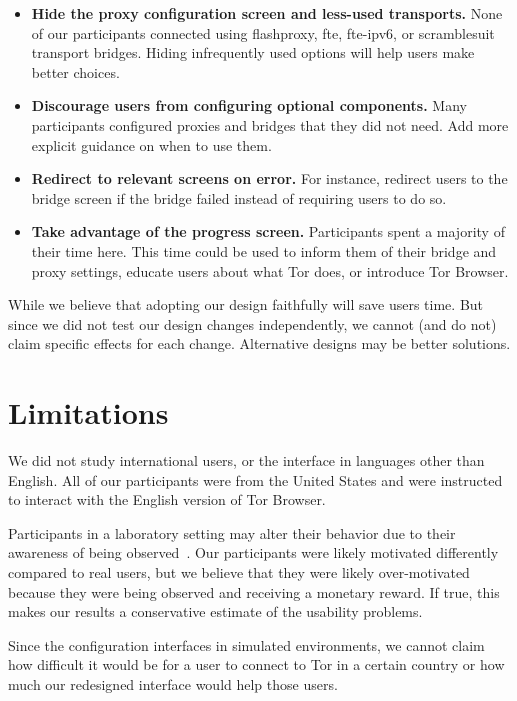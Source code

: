 \documentclass[USenglish,oneside,twocolumn]{article}
\begin{document}
\begin{itemize}
\item {\bfseries Hide the proxy configuration screen and less-used transports.} None of our participants connected using flashproxy, fte, fte-ipv6, or scramblesuit transport bridges. Hiding infrequently used options will help users make better choices.
\item {\bfseries Discourage users from configuring optional components.} Many participants configured proxies and bridges that they did not need. Add more explicit guidance on when to use them.
\item {\bfseries Redirect to relevant screens on error.} For instance, redirect users to the bridge screen if the bridge failed instead of requiring users to do so.
\item {\bfseries Take advantage of the progress screen.} Participants spent a majority of their time here. This time could be used to inform them of their bridge and proxy settings, educate users about what Tor does, or introduce Tor Browser.
\end{itemize}

While we believe that adopting our design faithfully will save users time. But since we did not test our design changes independently, we cannot (and do not) claim specific effects for each change. Alternative designs may be better solutions. 

\section{Limitations}
\label{sec:limitations}
We did not study international users, or the interface in languages other than English. All of our participants were from the United States and were instructed to interact with the English version of Tor Browser.

Participants in a laboratory setting may alter their behavior due to their awareness of being observed~\cite{mccarney2007hawthorne}. Our participants were likely motivated differently compared to real users, but we believe that they were likely over-motivated because they were being observed and receiving a monetary reward. If true, this makes our results a conservative estimate of the usability problems. 

Since the configuration interfaces in simulated environments, we cannot claim how difficult it would be for a user to connect to Tor in a certain country or how much our redesigned interface would help those users.  
\end{document}

